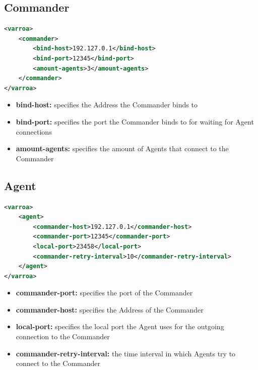 \subsection{Commander}\label{sec:commanderConfig}
\begin{lstlisting}[caption={Commander XML configuration}, captionpos=b, label={lst:commanderConfig}, language=XML]
<varroa>
    <commander>
		<bind-host>192.127.0.1</bind-host>
        <bind-port>12345</bind-port>
        <amount-agents>3</amount-agents>
    </commander>
</varroa>
\end{lstlisting}
\begin{itemize}
	\item \textbf{bind-host:} specifies the Address the Commander binds to
	\item \textbf{bind-port:} specifies the port the Commander binds to for waiting for Agent connections
	\item \textbf{amount-agents:} specifies the amount of Agents that connect to the Commander
\end{itemize}

\subsection{Agent}\label{sec:agentConfig}
\begin{lstlisting}[caption={Agent XML configuration}, captionpos=b, label={lst:agentConfig}, language=XML]
<varroa>
    <agent>
		<commander-host>192.127.0.1</commander-host>
        <commander-port>12345</commander-port>
        <local-port>23458</local-port>
		<commander-retry-interval>10</commander-retry-interval>
    </agent>
</varroa>
\end{lstlisting}
\begin{itemize}
	\item \textbf{commander-port:} specifies the port of the Commander
	\item \textbf{commander-host:} specifies the Address of the Commander
	\item \textbf{local-port:} specifies the local port the Agent uses for the outgoing connection to the Commander %
	\item \textbf{commander-retry-interval:} the time interval in which Agents try to connect to the Commander
\end{itemize}